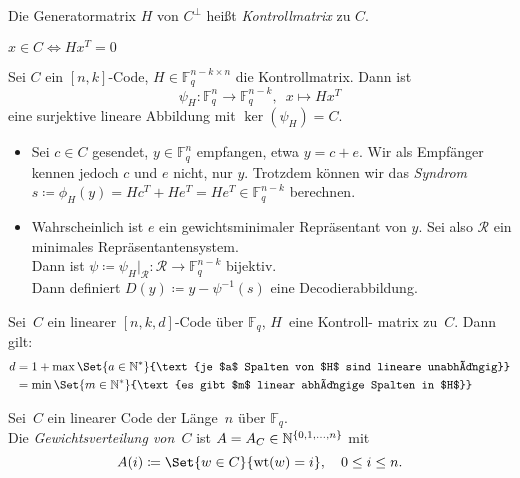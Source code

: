 \documentclass{cheat-sheet}
\newcommand{\F}{\mathbb{F}} %
\DeclareMathOperator{\wt}{wt} %
\begin{document}
\begin{defn}
  Die Generatormatrix $H$ von $C^\perp$ heißt \emph{Kontrollmatrix} zu $C$.
\end{defn}

\begin{lem}
  $x \in C \iff H x^T = 0$
\end{lem}

\begin{alg}
  Sei $C$ ein $[n,k]$-Code, $H \in \F_q^{n-k \times n}$ die Kontrollmatrix.
  Dann ist
  \[ \psi_H : \F_q^n \to \F_q^{n-k}, \enspace x \mapsto H x^T \]
  eine surjektive lineare Abbildung mit $\ker(\psi_H) = C$.
  \begin{itemize}
    \item Sei $c \in C$ gesendet, $y \in \F_q^n$ empfangen, etwa $y = c + e$.
    Wir als Empfänger kennen jedoch $c$ und $e$ nicht, nur $y$.
    Trotzdem können wir das \emph{Syndrom} $s \coloneqq \phi_H(y) = H c^T + H e^T = H e^T \in \F_q^{n-k}$ berechnen.
    \item Wahrscheinlich ist $e$ ein gewichtsminimaler Repräsentant von $y$.
    Sei also $\mathcal{R}$ ein minimales Repräsentantensystem. \\
    Dann ist $\psi \coloneqq \psi_H|_{\mathcal{R}} : \mathcal{R} \to \F_q^{n-k}$ bijektiv. \\
    Dann definiert $D(y) \coloneqq y - \psi^{-1}(s)$ eine Decodierabbildung.
  \end{itemize}
\end{alg}


\begin{satz}
  Sei~$C$ ein linearer $[n, k, d]$-Code über $\F_q$, $H$~eine Kontroll- matrix zu~$C$.
  Dann gilt:
  \begin{align*}
    d &= 1 + \max \Set{a \in \N^*}{\text{je $a$ Spalten von $H$ sind lineare unabhängig}} \\
    &= \min \Set{m \in \N^*}{\text{es gibt $m$ linear abhängige Spalten in $H$}}
  \end{align*}
\end{satz}

\begin{defn}
  Sei~$C$ ein linearer Code der Länge~$n$ über $\F_q$. \\
  Die \emph{Gewichtsverteilung von~$C$} ist
  $A = A_C \in \mathbb{N}^{\{ 0, 1, \ldots, n \}}$ mit
  \[
    A(i) \coloneqq \Set{w \in C}{\wt(w) = i}, \quad
    0 \leq i \leq n.
  \]
\end{defn}
\end{document}
